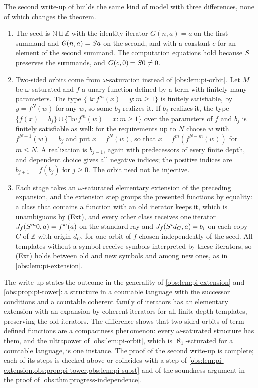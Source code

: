 \begin{remark}
\label{obs:rem:pi-saturation}
The second write-up of  builds the same kind of
model with three differences, none of which changes the theorem.
\begin{enumerate}[label=(\alph*)]
\item The seed is $\mathbb{N}\sqcup\mathbb{Z}$ with the identity iterator
$G(n,a)=a$ on the first summand and $G(n,a)=S a$ on the second, and with a
constant $c$ for an element of the second summand. The computation equations
hold because $S$ preserves the summands, and $G(c,0)=S 0\ne 0$.
\item Two-sided orbits come from $\omega$-saturation instead of
\cref{obs:lem:pi-orbit}. Let $M$ be $\omega$-saturated and $f$ a unary function
defined by a term with finitely many parameters. The type
$\{\exists x\,f^{m}(x)=y:m\ge 1\}$ is finitely satisfiable, by $y=f^{N}(w)$ for
any $w$, so some $b_0$ realizes it. If $b_j$ realizes it, the type
$\{f(x)=b_j\}\cup\{\exists w\,f^{m}(w)=x:m\ge 1\}$ over the parameters of $f$
and $b_j$ is finitely satisfiable as well: for the requirements up to $N$
choose $w$ with $f^{N+1}(w)=b_j$ and put $x=f^{N}(w)$, so that
$x=f^{m}(f^{N-m}(w))$ for $m\le N$. A realization is $b_{j-1}$, again with
predecessors of every finite depth, and dependent choice gives all negative
indices; the positive indices are $b_{j+1}=f(b_j)$ for $j\ge 0$. The orbit
need not be injective.
\item Each stage takes an $\omega$-saturated elementary extension of the
preceding expansion, and the extension step groups the presented functions by
equality: a class that contains a function with an old iterator keeps it, which
is unambiguous by (Ext), and every other class receives one iterator
$J_f(S^{m}0,a)=f^{m}(a)$ on the standard ray and $J_f(S^{i}d_C,a)=b_i$ on
each copy $C$ of $\mathbb{Z}$ with origin $d_C$, for one orbit of $f$ chosen
independently of the seed. All templates without a symbol receive symbols
interpreted by these iterators, so (Ext) holds between old and new symbols and
among new ones, as in \cref{obs:lem:pi-extension}.
\end{enumerate}
The write-up states the outcome in the generality of
\cref{obs:lem:pi-extension} and \cref{obs:prop:pi-tower}: a structure in a
countable language with the successor conditions and a countable coherent
family of iterators has an elementary extension with an expansion by coherent
iterators for all finite-depth templates, preserving the old iterators. The
difference shows that two-sided orbits of term-defined functions are a
compactness phenomenon: every $\omega$-saturated structure has them, and the
ultrapower of \cref{obs:lem:pi-orbit}, which is $\aleph_1$-saturated for a
countable language, is one instance. The proof of the second write-up is
complete; each of its steps is checked above or coincides with a step of
\cref{obs:lem:pi-extension,obs:prop:pi-tower,obs:lem:pi-subst} and of the
soundness argument in the proof of \cref{obs:thm:progress-independence}.
\end{remark}

